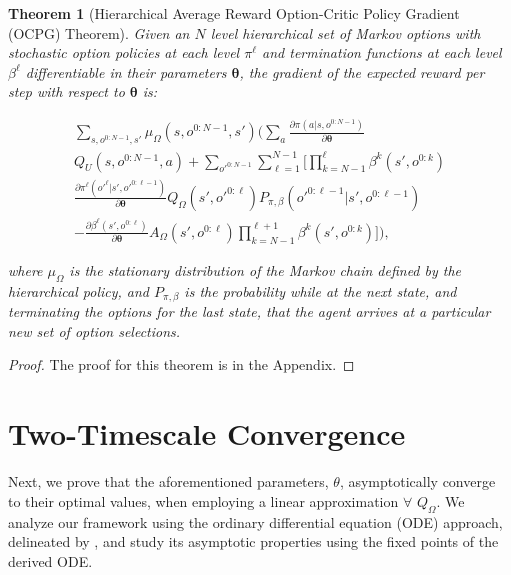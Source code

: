 \documentclass[letterpaper]{article} %
\newtheorem{theorem}{Theorem}
\newcommand{\citet}[1]{\citeauthor{#1} \shortcite{#1}}
\begin{document}
\begin{theorem}[Hierarchical Average Reward Option-Critic Policy Gradient (OCPG) Theorem]
\label{HARPG}
Given an $N$ level hierarchical set of  Markov  options  with  stochastic  option  policies at each level $\pi^\ell$ and termination functions at each level $\beta^\ell$ differentiable in their parameters $\bm{\theta}$, the gradient of the expected reward per step with respect to $\bm{\theta}$ is:

\begin{footnotesize}
\begin{align*}
    \sum_{s,o^{0:N-1},s'}\!\!\!\!\mu_\Omega(s,o^{0:N-1},s') 
    \bigg(\sum_{a} \frac{\partial \pi(a|s,o^{0:N-1})}{\partial \bm{\theta}} \\
    Q_U(s,o^{0:N-1},a) +  \sum_{o'^{0:N-1}} \sum_{\ell=1}^{N-1} \bigg[ \!\prod_{k=N-1}^{\ell}\!\!\!\!\beta^k(s',o^{0:k}) \\ \frac{\partial \pi^\ell(o'^\ell|s',o'^{0:\ell-1})}{\partial \bm{\theta}} Q_\Omega(s',o'^{0:\ell}) P_{\pi,\beta}(o'^{0:\ell-1}|s',o^{0:\ell-1}) \\
    - \frac{\partial \beta^\ell(s',o^{0:\ell})}{\partial \bm{\theta}} A_\Omega(s',o^{0:\ell})\!\!\!\!\prod_{k=N-1}^{\ell+1}\!\!\!\!\beta^k(s',o^{0:k}) \bigg] \bigg),
\end{align*}
\end{footnotesize}
where $\mu_\Omega$ is the stationary distribution of the Markov chain defined by the hierarchical policy, and $P_{\pi,\beta}$ is the probability while at the next state, and terminating the options for the last state, that the agent arrives at a particular new set of option selections.
\end{theorem}

\begin{proof}
The proof for this theorem is in the Appendix.
\end{proof}

\section{Two-Timescale Convergence}
Next, we prove that the aforementioned parameters, $\theta$, asymptotically converge to their optimal values, when employing a linear approximation $\forall$ $Q_\Omega$. 
We analyze our framework using the ordinary differential equation (ODE) approach, delineated by \citet{bhatnagar2009natural}, and study its asymptotic properties using the fixed points of the derived ODE.

\end{document}
